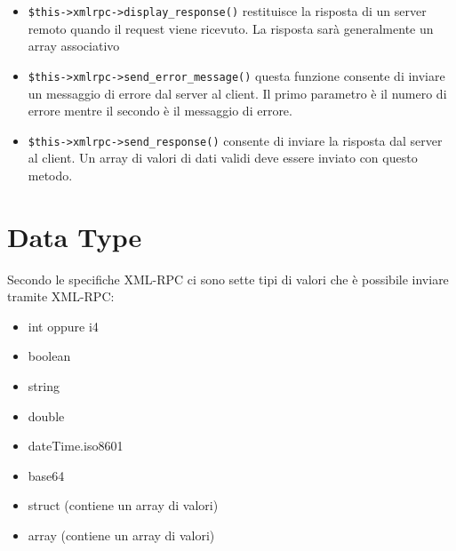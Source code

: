 \begin{itemize}

\item \verb|$this->xmlrpc->display_response()| restituisce la risposta di un server remoto quando il request viene ricevuto. La risposta sarà generalmente un array associativo


\item \verb|$this->xmlrpc->send_error_message()| questa funzione consente di inviare un messaggio di errore dal server al client. Il primo parametro è il numero di errore mentre il secondo è il messaggio di errore.


\item \verb|$this->xmlrpc->send_response()| consente di inviare la risposta dal server al client. Un array di valori di dati validi deve essere inviato con questo metodo.

\end{itemize}

\section*{Data Type}
Secondo le specifiche XML-RPC ci sono sette tipi di valori che è possibile inviare tramite XML-RPC:

\begin{itemize}
\item int oppure i4
\item boolean
\item string
\item double
\item dateTime.iso8601
\item base64
\item struct (contiene un array di valori)
\item array (contiene un array di valori) 
\end{itemize}